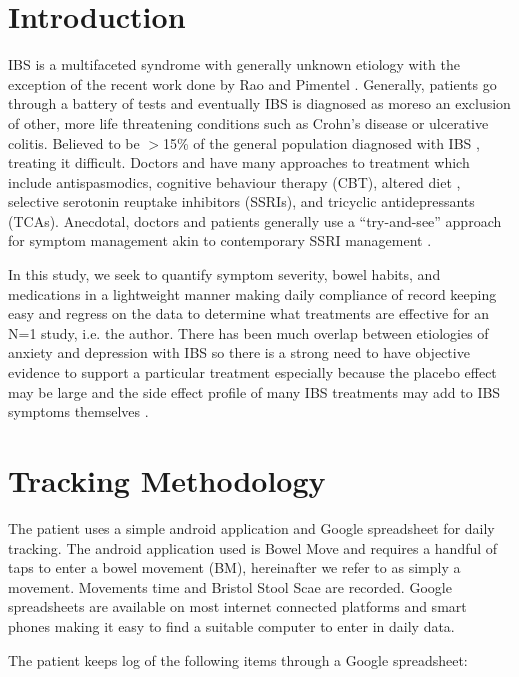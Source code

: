 \documentclass[conference]{IEEEtran}
\begin{document}
\section{Introduction}
IBS is a multifaceted syndrome with generally unknown etiology with the exception of the recent work done by Rao \cite{erdogan2015small} and Pimentel \cite{pimentel2000eradication}.  Generally, patients go through a battery of tests and eventually IBS is diagnosed as moreso an exclusion of other, more life threatening conditions such as Crohn's disease or ulcerative colitis.   Believed to be $>$15\% of the general population diagnosed with IBS \cite{drossman1982bowel}, treating it difficult.  Doctors and have many approaches to treatment which include antispasmodics, cognitive behaviour therapy (CBT), altered diet \cite{gibson2010evidence}, selective serotonin reuptake inhibitors (SSRIs), and tricyclic antidepressants (TCAs). Anecdotal, doctors and patients generally use a “try-and-see” approach for symptom management akin to contemporary SSRI management \cite{trivedi2006evaluation}.

In this study, we seek to quantify symptom severity, bowel habits, and medications in a lightweight manner making daily compliance of record keeping easy and regress on the data to determine what treatments are effective for an N=1 study, i.e. the author.  There has been much overlap between etiologies of anxiety and depression with IBS so there is a strong need to have objective evidence to support a particular treatment especially because the placebo effect \cite{kaptchuk2008components} may be large and the side effect profile of many IBS treatments may add to IBS symptoms themselves \cite{vanderhoff2002proton}.

\section{Tracking Methodology}

The patient uses a simple android application and Google spreadsheet for daily tracking.  The android application used is Bowel Move \cite{bowelmove2017} and requires a handful of taps to enter a bowel movement (BM), hereinafter we refer to as simply a movement. Movements time and Bristol Stool Scae \cite{lewis1997stool} are recorded.  Google spreadsheets are available on most internet connected platforms and smart phones making it easy to find a suitable computer to enter in daily data.  

The patient keeps log of the following items through a Google spreadsheet:
\end{document}
